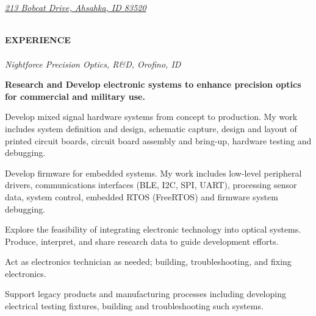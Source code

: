 \documentclass[10pt,letterpaper]{article}
\begin{document}
\hspace*{\fill}{\sl (509) 701-9014}	 \vspace{.3pc}\\ 
\hspace*{\fill}{\sl tedfernau@gmail.com} \vspace{.3pc}\\ 
\hspace*{\fill}\href{http://www.mailaletter.com/}{\sc\sl 213 Bobcat Drive, Ahsahka, ID 83520}\vspace{.3pc}\\ 
 \vspace{.3pc}\\ 
\noindent\makebox[\linewidth]{\rule{\linewidth}{0.4pt}}

\vspace*{\fill}

{\noindent\sc\bf EXPERIENCE}\vspace{.3pc}\\
\indent{}	\hspace*{\fill}{ March 2018, current employer} \\
\indent\indent 
{\sl Nightforce Precision Optics, R\&D, Orofino, ID}
				\vspace{0.1in}
                 \begin{itemize}[leftmargin=0.75in, rightmargin=0.25in, topsep=0mm,itemindent=0mm, label=\textrm{--}]
  {\small\sl
\item {\bf Research and Develop electronic systems to enhance precision optics for commercial and military use.} 
\item Develop mixed signal hardware systems from concept to production. My work includes system definition and design, schematic capture, design and layout of printed circuit boards, circuit board assembly and bring-up, hardware testing and debugging.
\item Develop firmware for embedded systems. My work includes low-level peripheral drivers, communications interfaces (BLE, I2C, SPI, UART), processing sensor data, system control, embedded RTOS (FreeRTOS) and firmware system debugging. 
\item Explore the feasibility of integrating electronic technology into optical systems. Produce, interpret, and share research data to guide development efforts. 
\item Act as electronics technician as needed; building, troubleshooting, and fixing electronics.
\item Support legacy products and manufacturing processes including developing electrical testing fixtures, building and troubleshooting such systems. 
}
\end{itemize}
\end{document}
